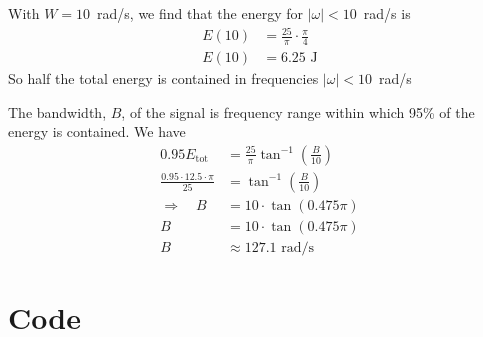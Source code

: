 \documentclass[twocolumn]{myarticle}
\begin{document}
With $ W = 10 $~rad/s, we find that the energy for $ |\omega| < 10 $~rad/s is
\begin{align}
    E(10) &= \frac{25}{\pi} \cdot \frac{\pi}{4}
    \\
    E(10) &= 6.25 \text{ J}
\end{align}
So half the total energy is contained in frequencies $ |\omega| < 10 $~rad/s

The bandwidth, $ B $, of the signal is frequency range within which 95\% of the energy is contained.
We have
\begin{align}
    0.95 E_\text{tot} &= \frac{25}{\pi} \tan^{-1} \left( \frac{B}{10} \right)
    \\
    \frac{0.95 \cdot 12.5 \cdot \pi}{25} &= \tan^{-1} \left( \frac{B}{10} \right)
    \\
    \Longrightarrow \quad B &= 10 \cdot \tan (0.475 \pi)
    \\
    B &= 10 \cdot \tan (0.475 \pi)
    \\
    B &\approx 127.1 \text{ rad/s}
\end{align}

\onecolumn

\section{Code}
\label{sec:code}

%
\end{document}
